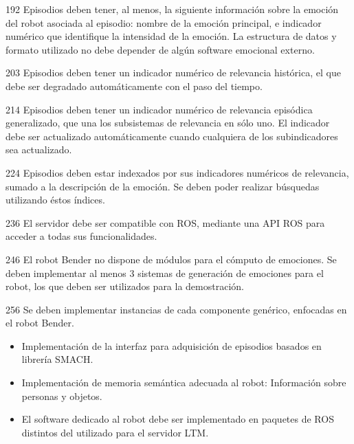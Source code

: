 \begin{requisito-sistema}{19}{2}
	Episodios deben tener, al menos, la siguiente información sobre la emoción del robot asociada al episodio: nombre de la emoción principal, e indicador numérico que identifique la intensidad de la emoción. La estructura de datos y formato utilizado no debe depender de algún software emocional externo.
\end{requisito-sistema}

\begin{requisito-sistema}{20}{3}
	Episodios deben tener un indicador numérico de relevancia histórica, el que debe ser degradado automáticamente con el paso del tiempo.	
\end{requisito-sistema}

\begin{requisito-sistema}{21}{4}
	Episodios deben tener un indicador numérico de relevancia episódica generalizado, que una los subsistemas de relevancia en sólo uno. El indicador debe ser actualizado automáticamente cuando cualquiera de los subindicadores sea actualizado.
\end{requisito-sistema}

\begin{requisito-sistema}{22}{4}
	Episodios deben estar indexados por sus indicadores numéricos de relevancia, sumado a la descripción de la emoción. Se deben poder realizar búsquedas utilizando éstos índices.
\end{requisito-sistema}

\begin{requisito-sistema}{23}{6}
	El servidor debe ser compatible con ROS, mediante una API ROS para acceder a todas sus funcionalidades.	
\end{requisito-sistema}

\begin{requisito-sistema}{24}{6}
	El robot Bender no dispone de módulos para el cómputo de emociones. Se deben implementar al menos 3 sistemas de generación de emociones para el robot, los que deben ser utilizados para la demostración.	
\end{requisito-sistema}

\begin{requisito-sistema}{25}{6}
	Se deben implementar instancias de cada componente genérico, enfocadas en el robot Bender.
	\begin{itemize}
		\item Implementación de la interfaz para adquisición de episodios basados en librería SMACH.
		\item Implementación de memoria semántica adecuada al robot: Información sobre personas y objetos.
		\item El software dedicado al robot debe ser implementado en paquetes de ROS distintos del utilizado para el servidor LTM.
	\end{itemize}	
\end{requisito-sistema}

